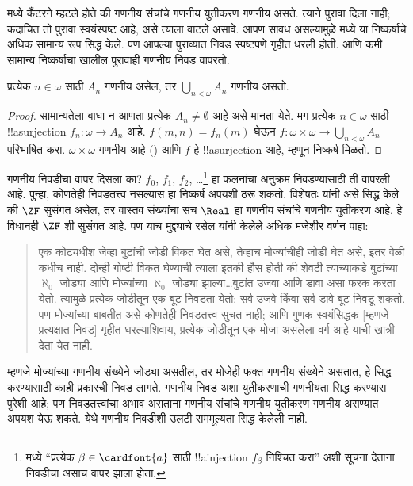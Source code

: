 \documentclass[../../../include/open-logic-section]{subfiles}
\begin{document}
\begin{ex}
\citeyear{Cantor1878} मध्ये कँटरने म्हटले होते की गणनीय संचांचे गणनीय युतीकरण गणनीय असते. त्याने पुरावा दिला नाही; कदाचित तो पुरावा स्वयंस्पष्ट आहे, असे त्याला वाटले असावे. आपण सावध असल्यामुळे  मध्ये या निष्कर्षाचे अधिक सामान्य रूप सिद्ध केले. पण आपल्या पुराव्यात निवड स्पष्टपणे गृहीत धरली होती. आणि कमी सामान्य निष्कर्षाचा खालील पुरावाही गणनीय निवड वापरतो.

\begin{thm}
प्रत्येक $n \in \omega$ साठी $A_n$ गणनीय असेल, तर $\bigcup_{n <
\omega} A_n$ गणनीय असतो.
\end{thm}

\begin{proof}
सामान्यतेला बाधा न आणता प्रत्येक $A_n \neq \emptyset$ आहे असे मानता येते. मग प्रत्येक $n \in \omega$ साठी !!a{surjection} $f_n \colon \omega
\to A_n$ आहे. $f(m, n) = f_n(m)$ घेऊन $f \colon \omega \times \omega \to \bigcup_{n <
\omega} A_n$ परिभाषित करा. $\omega
\times \omega$ गणनीय आहे () आणि $f$ हे !!a{surjection} आहे, म्हणून निष्कर्ष मिळतो.
\end{proof}
\noindent
गणनीय निवडीचा वापर दिसला का? $f_0$, $f_1$, $f_2$, \dots\footnote{ मध्ये “प्रत्येक $\beta \in \cardfont{a}$ साठी !!a{injection} $f_\beta$ निश्चित करा” अशी सूचना देताना निवडीचा असाच वापर झाला होता.} हा फलनांचा अनुक्रम निवडण्यासाठी ती वापरली आहे. पुन्हा, कोणतेही निवडतत्त्व नसल्यास हा निष्कर्ष अपयशी ठरू शकतो. विशेषतः \citet{FefermanLevy1963} यांनी असे सिद्ध केले की $\ZF$ सुसंगत असेल, तर वास्तव संख्यांचा संच $\Real$ हा गणनीय संचांचे गणनीय युतीकरण आहे, हे विधानही $\ZF$ शी सुसंगत आहे. पण याच मुद्द्याचे रसेल यांनी केलेले अधिक मजेशीर वर्णन पाहा:
\begin{quote}
  एक कोट्यधीश जेव्हा बुटांची जोडी विकत घेत असे, तेव्हाच मोज्यांचीही जोडी घेत असे, इतर वेळी कधीच नाही. दोन्ही गोष्टी विकत घेण्याची त्याला इतकी हौस होती की शेवटी त्याच्याकडे बुटांच्या $\aleph_0$ जोड्या आणि मोज्यांच्या $\aleph_0$ जोड्या झाल्या\dots\@ बुटांत उजवा आणि डावा असा फरक करता येतो. त्यामुळे प्रत्येक जोडीतून एक बूट निवडता येतो: सर्व उजवे किंवा सर्व डावे बूट निवडू शकतो. पण मोज्यांच्या बाबतीत असे कोणतेही निवडतत्त्व सुचत नाही; आणि गुणक स्वयंसिद्धक [म्हणजे प्रत्यक्षात निवड] गृहीत धरल्याशिवाय, प्रत्येक जोडीतून एक मोजा असलेला वर्ग आहे याची खात्री देता येत नाही.
  \citep[पृ.~126]{Russell1919}
\end{quote}
म्हणजे मोज्यांच्या गणनीय संख्येने जोड्या असतील, तर मोजेही फक्त गणनीय संख्येने असतात, हे सिद्ध करण्यासाठी काही प्रकारची निवड लागते. गणनीय निवड अशा युतीकरणाची गणनीयता सिद्ध करण्यास पुरेशी आहे; पण निवडतत्त्वांचा अभाव असताना गणनीय संचांचे गणनीय युतीकरण गणनीय असण्यात अपयश येऊ शकते. येथे गणनीय निवडीशी उलटी सममूल्यता सिद्ध केलेली नाही.
\end{ex}
\end{document}
